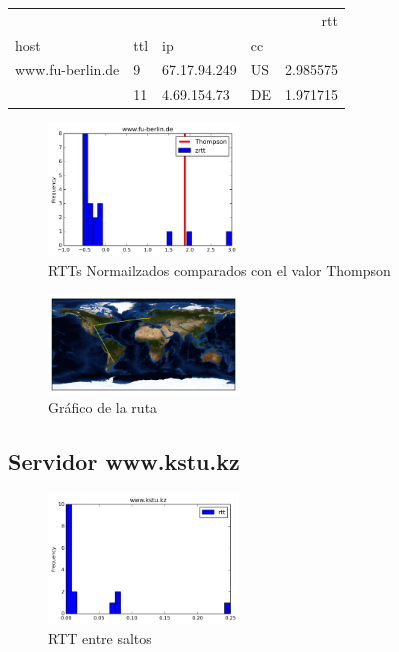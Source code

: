 \begin{center}
\begin{tabular}{llllr}
\toprule
                 &    &                &    &       rtt \\
host & ttl & ip & cc &           \\
\midrule
www.fu-berlin.de & 9  & 67.17.94.249 & US &  2.985575 \\
                 & 11 & 4.69.154.73 &  DE &  1.971715 \\
\bottomrule
\end{tabular}

\end{center}

\begin{figure}[H]
  \centering
    \includegraphics[width=0.45\textwidth]{histogramas_thompson/www-fu-berlin-de.png}
  \caption{RTTs Normailzados comparados con el valor Thompson}
  \label{entropia-s}
\end{figure}

\begin{figure}[H]
  \centering
    \includegraphics[width=0.45\textwidth]{grafico-rutas/www-fu-berlin-de.png}
  \caption{Gráfico de la ruta}
  \label{entropia-s}
\end{figure}




\subsection{Servidor www.kstu.kz}
\begin{figure}[H]
  \centering
    \includegraphics[width=0.45\textwidth]{histogramas_rtt/www-kstu-kz.png}
  \caption{RTT entre saltos}
  \label{entropia-s}
\end{figure}

